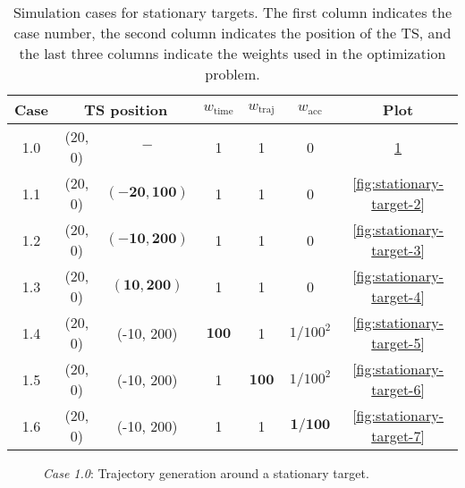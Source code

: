 \begin{table}
    \centering
    \begin{tabular}{|c|c|c|c|c|c|c|}
        \hline
        Case & \multicolumn{2}{c|}{TS position} & $w_\text{time}$ & $w_\text{traj}$ & $w_\text{acc}$ & Plot \\
        \hline
        1.0 & (20, 0) & $-$ & 1 & 1 & 0 & \cref{fig:stationary-target} \\
        \hline
        1.1 & (20, 0) & $\mathbf{(-20, 100)}$ & 1 & 1 & 0 & \cref{fig:stationary-target-2} \\
        \hline
        1.2 & (20, 0) & $\mathbf{(-10, 200)}$ & 1 & 1 & 0 & \cref{fig:stationary-target-3} \\
        \hline
        1.3 & (20, 0) & $\mathbf{(10, 200)}$ & 1 & 1 & 0 & \cref{fig:stationary-target-4} \\
        \hline
        1.4 & (20, 0) & (-10, 200) & $\mathbf{100}$ & 1 & $1/100^2$ & \cref{fig:stationary-target-5} \\
        \hline
        1.5 & (20, 0) & (-10, 200) & 1 & $\mathbf{100}$ & $1/100^2$ & \cref{fig:stationary-target-6} \\
        \hline
        1.6 & (20, 0) & (-10, 200) & 1 & 1 & $\mathbf{1/100}$ & \cref{fig:stationary-target-7} \\
        \hline
    \end{tabular}
    \caption{Simulation cases for stationary targets. The first column indicates the case number, the second column indicates the position of the TS, and the last three columns indicate the weights used in the optimization problem.}
    \label{tab:stationary-targets}
\end{table}


\begin{figure}
    \centering
    
    \caption{\emph{Case 1.0}: Trajectory generation around a stationary target. }
    \label{fig:stationary-target}
\end{figure}

